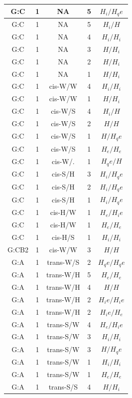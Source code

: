 \begin{center}
\begin{longtable}{c|c|c|c|c}
G:C & 1 & NA & 5 & $H_i/H_qe$ \\  \hline
G:C & 1 & NA & 5 & $H_i/H$ \\  \hline
G:C & 1 & NA & 4 & $H_i/H_i$ \\  \hline
G:C & 1 & NA & 3 & $H/H_i$ \\  \hline
G:C & 1 & NA & 2 & $H/H_i$ \\  \hline
G:C & 1 & NA & 1 & $H/H_i$ \\  \hline
G:C & 1 & cis-W/W & 4 & $H_i/H_i$ \\  \hline
G:C & 1 & cis-W/W & 1 & $H/H_i$ \\  \hline
G:C & 1 & cis-W/S & 4 & $H_i/H$ \\  \hline
G:C & 1 & cis-W/S & 2 & $H/H$ \\  \hline
G:C & 1 & cis-W/S & 1 & $H/H_qe$ \\  \hline
G:C & 1 & cis-W/S & 1 & $H_e/H_e$ \\  \hline
G:C & 1 & cis-W/. & 1 & $H_qe/H$ \\  \hline
G:C & 1 & cis-S/H & 3 & $H_i/H_qe$ \\  \hline
G:C & 1 & cis-S/H & 2 & $H_i/H_qe$ \\  \hline
G:C & 1 & cis-S/H & 1 & $H_i/H_qe$ \\  \hline
G:C & 1 & cis-H/W & 1 & $H_e/H_ie$ \\  \hline
G:C & 1 & cis-H/W & 1 & $H_e/H_e$ \\  \hline
G:C & 1 & cis-H/S & 1 & $H_i/H_i$ \\  \hline
G:CB2 & 1 & cis-W/W & 3 & $H/H$ \\  \hline
G:A & 1 & trans-W/S & 2 & $H_qe/H_qe$ \\  \hline
G:A & 1 & trans-W/H & 5 & $H_e/H_e$ \\  \hline
G:A & 1 & trans-W/H & 4 & $H/H$ \\  \hline
G:A & 1 & trans-W/H & 2 & $H_ie/H_ie$ \\  \hline
G:A & 1 & trans-W/H & 2 & $H_ie/H_e$ \\  \hline
G:A & 1 & trans-S/W & 4 & $H_e/H_ie$ \\  \hline
G:A & 1 & trans-S/W & 3 & $H_i/H_i$ \\  \hline
G:A & 1 & trans-S/W & 3 & $H/H_qe$ \\  \hline
G:A & 1 & trans-S/W & 1 & $H_i/H_i$ \\  \hline
G:A & 1 & trans-S/W & 1 & $H_e/H_e$ \\  \hline
G:A & 1 & trans-S/S & 4 & $H/H_i$ \\  \hline

\end{longtable}
\end{center}
